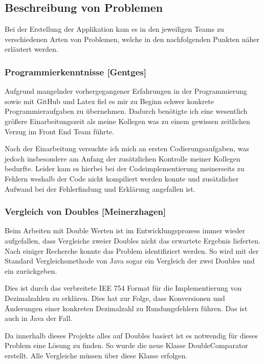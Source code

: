 \clearpage

\subsection{Beschreibung von Problemen}

Bei der Erstellung der Applikation kam es in den jeweiligen Teams zu verschiedenen Arten von Problemen, welche in den nachfolgenden Punkten näher erläutert werden.

\subsubsection{Programmierkenntnisse [Gentges]}

Aufgrund mangelnder vorhergegangener Erfahrungen in der Programmierung sowie mit GitHub und Latex fiel es mir zu Beginn schwer konkrete Programmieraufgaben zu übernehmen. Dadurch benötigte ich eine wesentlich größere Einarbeitungszeit als meine Kollegen was zu einem gewissen zeitlichen Verzug im Front End Team führte.

Nach der Einarbeitung versuchte ich mich an ersten Codierungsaufgaben, was jedoch insbesondere am Anfang der zusätzlichen Kontrolle meiner Kollegen bedurfte. 
Leider kam es hierbei bei der Codeimplementierung meinerseits zu Fehlern weshalb der Code nicht kompiliert werden konnte und zusätzlicher Aufwand bei der Fehlerfindung und Erklärung angefallen ist. 

\subsubsection{Vergleich von Doubles [Meinerzhagen]}
Beim Arbeiten mit Double Werten ist im Entwicklungsprozess immer wieder aufgefallen, dass Vergleiche zweier Doubles nicht das erwartete Ergebnis lieferten. Nach einiger Recherche konnte das Problem identifiziert werden. So wird mit der Standard Vergleichsmethode von Java sogar ein  Vergleich der zwei Doubles  und  ein  zurückgeben.

Dies ist durch das verbreitete IEE 754 Format für die Implementierung von Dezimalzahlen zu erklären. Dies hat zur Folge, dass Konversionen und Änderungen einer konkreten Dezimalzahl zu Rundungsfehlern führen. Das ist auch in Java der Fall.

Da innerhalb dieses Projekts alles auf Doubles basiert ist es notwendig für dieses Problem eine Lösung zu finden. So wurde die neue Klasse DoubleComparator erstellt. Alle Vergleiche müssen über diese Klasse erfolgen.

